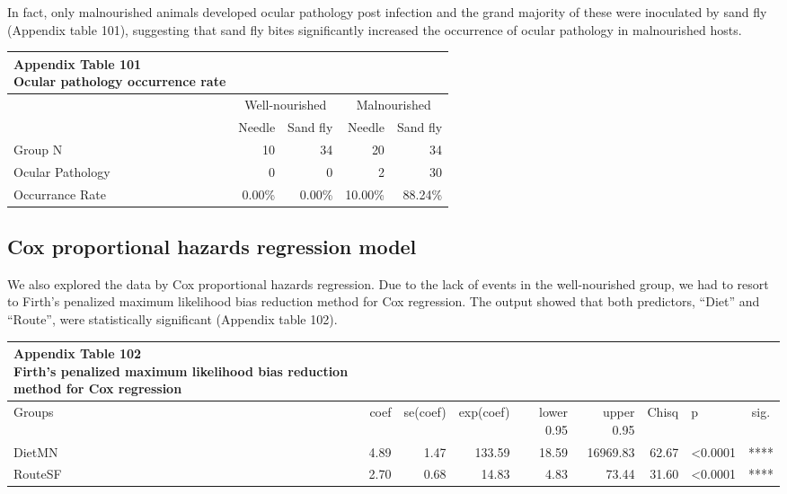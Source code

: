 \documentclass[
  12pt,
  letterpaper,
]{article}
\begin{document}
In fact, only malnourished animals developed ocular pathology post infection and the grand majority of these were inoculated by sand fly (Appendix table 101), suggesting that sand fly bites significantly increased the occurrence of ocular pathology in malnourished hosts.

\begingroup
\fontsize{12.0pt}{14.4pt}\selectfont
\begin{longtable}{l|rrrr}
\caption*{
{\large \textbf{Appendix Table 101}} \\ 
{\small \textbf{Ocular pathology occurrence rate}}
} \\ 
\toprule
 & \multicolumn{2}{c}{Well-nourished} & \multicolumn{2}{c}{Malnourished} \\ 
\cmidrule(lr){2-3} \cmidrule(lr){4-5}
 & Needle & Sand fly & Needle & Sand fly \\ 
\midrule\addlinespace[2.5pt]
Group N & 10 & 34 & 20 & 34 \\ 
Ocular Pathology &  0 &  0 &  2 & 30 \\ 
Occurrance Rate &  0.00\% &  0.00\% & 10.00\% & 88.24\% \\ 
\bottomrule
\end{longtable}
\endgroup

\subsection{Cox proportional hazards regression model}\label{cox-proportional-hazards-regression-model}

We also explored the data by Cox proportional hazards regression. Due to the lack of events in the well-nourished group, we had to resort to Firth's penalized maximum likelihood bias reduction method for Cox regression. The output showed that both predictors, ``Diet'' and ``Route'', were statistically significant (Appendix table 102).

\begingroup
\fontsize{12.0pt}{14.4pt}\selectfont
\begin{longtable}{l|rrrrrrlc}
\caption*{
{\large \textbf{Appendix Table 102}} \\ 
{\small \textbf{Firth's penalized maximum likelihood bias reduction method for Cox regression}}
} \\ 
\toprule
Groups & {coef} & {se(coef)} & {exp(coef)} & {lower 0.95} & {upper 0.95} & {Chisq} & {p} & {sig.} \\ 
\midrule\addlinespace[2.5pt]
DietMN & 4.89 & 1.47 & 133.59 & 18.59 & 16969.83 & 62.67 & <0.0001 & **** \\ 
RouteSF & 2.70 & 0.68 & 14.83 & 4.83 & 73.44 & 31.60 & <0.0001 & **** \\ 
\bottomrule
\end{longtable}
\endgroup
\end{document}
